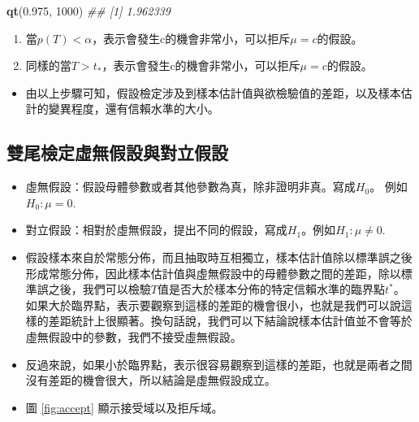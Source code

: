 \documentclass[hyperref,]{ctexart}
\newenvironment{Shaded}{\begin{snugshade}}{\end{snugshade}}
\newcommand{\CommentTok}[1]{\textcolor[rgb]{0.56,0.35,0.01}{\textit{#1}}}
\newcommand{\DecValTok}[1]{\textcolor[rgb]{0.00,0.00,0.81}{#1}}
\newcommand{\FloatTok}[1]{\textcolor[rgb]{0.00,0.00,0.81}{#1}}
\newcommand{\KeywordTok}[1]{\textcolor[rgb]{0.13,0.29,0.53}{\textbf{#1}}}
\newcommand{\NormalTok}[1]{#1}
\providecommand{\tightlist}{%
  \setlength{\itemsep}{0pt}\setlength{\parskip}{0pt}}
\begin{document}
\begin{Shaded}
\begin{Highlighting}[]
\KeywordTok{qt}\NormalTok{(}\FloatTok{0.975}\NormalTok{, }\DecValTok{1000}\NormalTok{)}
\CommentTok{## [1] 1.962339}
\end{Highlighting}
\end{Shaded}

\begin{enumerate}
\def\labelenumi{\arabic{enumi}.}
\setcounter{enumi}{5}
\item
  當\(p(T)<\alpha\)，表示會發生c的機會非常小，可以拒斥\(\mu=c\)的假設。
\item
  同樣的當\(T>t_{*}\)，表示會發生c的機會非常小，可以拒斥\(\mu=c\)的假設。
\end{enumerate}

\begin{itemize}
\tightlist
\item
  由以上步驟可知，假設檢定涉及到樣本估計值與欲檢驗值的差距，以及樣本估計的變異程度，還有信賴水準的大小。
\end{itemize}

\hypertarget{ux96d9ux5c3eux6aa2ux5b9aux865bux7121ux5047ux8a2dux8207ux5c0dux7acbux5047ux8a2d}{%
\subsection{雙尾檢定虛無假設與對立假設}\label{ux96d9ux5c3eux6aa2ux5b9aux865bux7121ux5047ux8a2dux8207ux5c0dux7acbux5047ux8a2d}}

\begin{itemize}
\item
  虛無假設：假設母體參數或者其他參數為真，除非證明非真。寫成\(H_{\text{0}}\)。
  例如\(H_{\text{0}}: \mu = 0\).
\item
  對立假設：相對於虛無假設，提出不同的假設，寫成\(H_{\text{1}}\)。例如\(H_{\text{1}}: \mu \neq 0\).
\item
  假設樣本來自於常態分佈，而且抽取時互相獨立，樣本估計值除以標準誤之後形成常態分佈，因此樣本估計值與虛無假設中的母體參數之間的差距，除以標準誤之後，我們可以檢驗\(T\)值是否大於樣本分佈的特定信賴水準的臨界點\(t^{*}\)。如果大於臨界點，表示要觀察到這樣的差距的機會很小，也就是我們可以說這樣的差距統計上很顯著。換句話說，我們可以下結論說樣本估計值並不會等於虛無假設中的參數，我們不接受虛無假設。
\item
  反過來說，如果小於臨界點，表示很容易觀察到這樣的差距，也就是兩者之間沒有差距的機會很大，所以結論是虛無假設成立。
\item
  圖 \ref{fig:accept} 顯示接受域以及拒斥域。
\end{itemize}
\end{document}
